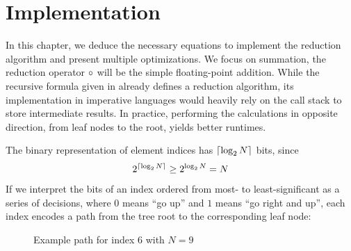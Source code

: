 \chapter{Implementation}
\label{ch:Implementation}

In this chapter, we deduce the necessary equations to implement the reduction algorithm and present multiple optimizations.
We focus on summation, the reduction operator $\operatorname{\circ}$ will be the simple floating-point addition.
While the recursive formula given in  already defines a reduction algorithm, its implementation in imperative languages would heavily rely on the call stack to store intermediate results.
In practice, performing the calculations in opposite direction, from leaf nodes to the root, yields better runtimes.

The binary representation of element indices has $\lceil \log_2 N \rceil$ bits, since
\begin{equation}
2^{\lceil \log_2 N \rceil} \geq 2^{\log_2 N} = N
\end{equation}
If we interpret the bits of an index ordered from most- to least-significant as a series of decisions, where $0$ means \enquote{go up} and $1$ means \enquote{go right and up}, each index encodes a path from the tree root to the corresponding leaf node:

\begin{figure}[H]
\centering
{}
\caption{Example path for index $6$ with $N = 9$}
\label{fig:indexTreePath}
\end{figure}

